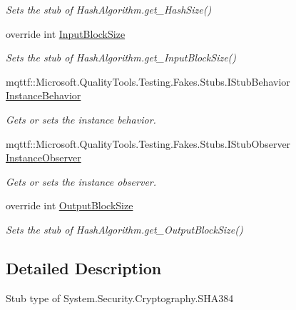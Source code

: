 \begin{DoxyCompactItemize}
\begin{DoxyCompactList}\small\item\em Sets the stub of Hash\-Algorithm.\-get\-\_\-\-Hash\-Size()\end{DoxyCompactList}\item 
override int \hyperlink{class_system_1_1_security_1_1_cryptography_1_1_fakes_1_1_stub_s_h_a384_a312ba9c29ed26748c5628a9327e8995e}{Input\-Block\-Size}
\begin{DoxyCompactList}\small\item\em Sets the stub of Hash\-Algorithm.\-get\-\_\-\-Input\-Block\-Size()\end{DoxyCompactList}\item 
mqttf\-::\-Microsoft.\-Quality\-Tools.\-Testing.\-Fakes.\-Stubs.\-I\-Stub\-Behavior \hyperlink{class_system_1_1_security_1_1_cryptography_1_1_fakes_1_1_stub_s_h_a384_a2aab5d0e87d36ea48a614e78d3c0048b}{Instance\-Behavior}
\begin{DoxyCompactList}\small\item\em Gets or sets the instance behavior.\end{DoxyCompactList}\item 
mqttf\-::\-Microsoft.\-Quality\-Tools.\-Testing.\-Fakes.\-Stubs.\-I\-Stub\-Observer \hyperlink{class_system_1_1_security_1_1_cryptography_1_1_fakes_1_1_stub_s_h_a384_a2a2682d0531a44b753e2b26d99e9ffe6}{Instance\-Observer}
\begin{DoxyCompactList}\small\item\em Gets or sets the instance observer.\end{DoxyCompactList}\item 
override int \hyperlink{class_system_1_1_security_1_1_cryptography_1_1_fakes_1_1_stub_s_h_a384_a2a165df5d703d53f9d8a34344f01e4b2}{Output\-Block\-Size}
\begin{DoxyCompactList}\small\item\em Sets the stub of Hash\-Algorithm.\-get\-\_\-\-Output\-Block\-Size()\end{DoxyCompactList}\end{DoxyCompactItemize}


\subsection{Detailed Description}
Stub type of System.\-Security.\-Cryptography.\-S\-H\-A384



